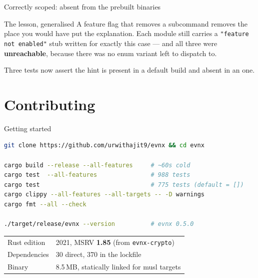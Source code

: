 \documentclass[aspectratio=169,10pt]{beamer}
\begin{document}
\begin{frame}[fragile]{Correctly scoped: absent from the prebuilt binaries}

  \begin{block}{The lesson, generalised}
    A feature flag that removes a subcommand removes the place you would have
    put the explanation. Each module still carries a
    \texttt{"feature not enabled"} stub written for exactly this case --- and
    all three were \textbf{unreachable}, because there was no enum variant left
    to dispatch to.
  \end{block}

  \vspace{0.4em}
  {\footnotesize Three tests now assert the hint is present in a default build
  and absent in an  one.}
\end{frame}

\section{Contributing}

\begin{frame}[fragile]{Getting started}
\begin{lstlisting}[style=evnxcode,language=bash]
git clone https://github.com/urwithajit9/evnx && cd evnx

cargo build --release --all-features     # ~60s cold
cargo test  --all-features               # 988 tests
cargo test                               # 775 tests (default = [])
cargo clippy --all-features --all-targets -- -D warnings
cargo fmt --all --check

./target/release/evnx --version          # evnx 0.5.0
\end{lstlisting}

  \vspace{0.4em}
  \begin{tabular}{@{}ll@{}}
    Rust edition & 2021, MSRV \textbf{1.85} (from \texttt{evnx-crypto}) \\
    Dependencies & 30 direct, 370 in the lockfile \\
    Binary       & 8.5\,MB, statically linked for musl targets \\
  \end{tabular}
\end{frame}
\end{document}
